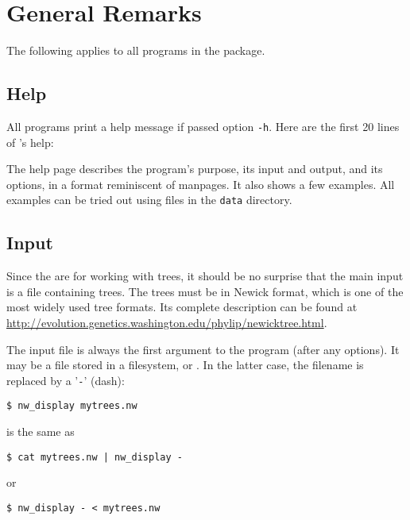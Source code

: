 
\chapter{General Remarks}
\label{chap_general}

The following applies to all programs in the \nutils{} package.

\section{Help}
\label{sct_help}

All programs print a help message if passed option \texttt{-h}. Here are the
first 20 lines of \nwindent{}'s help:


\begin{samepage}

\end{samepage}

The help page describes the program's purpose, its input and output, and its
options, in a format reminiscent of \unix{} manpages. It also shows a few
examples. All examples can be tried out using files in the \texttt{data}
directory.

\section{Input}
\label{sct_input}

Since the \nutils{} are for working with trees, it should be no surprise
that the main input is a file containing trees. The trees must be in
Newick format, which is one of the most widely used tree formats. Its
complete description can be found at
\url{http://evolution.genetics.washington.edu/phylip/newicktree.html}.

The input file is always the first argument to the program (after any options).
It may be a file stored in a filesystem, or \stdin{}. In the latter case, the
filename is replaced by a '\texttt{-}' (dash):

\begin{samepage}
\begin{verbatim}
$ nw_display mytrees.nw
\end{verbatim}
is the same as
\begin{verbatim}
$ cat mytrees.nw | nw_display -
\end{verbatim}
or
\begin{verbatim}
$ nw_display - < mytrees.nw
\end{verbatim}
\end{samepage}

